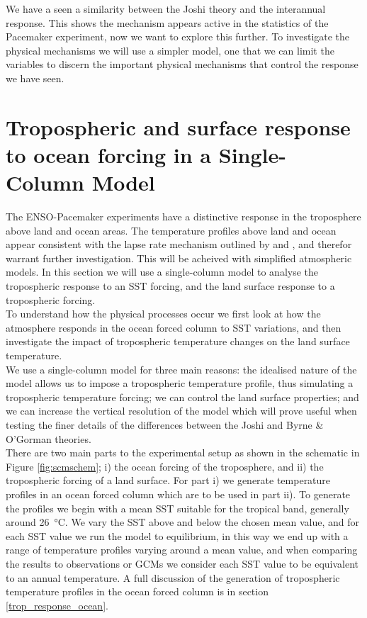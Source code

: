 We have a seen a similarity between the Joshi theory and the interannual 
response. This shows the mechanism appears active in the statistics of the 
Pacemaker experiment, now we want to explore this further. To investigate the 
physical mechanisms we will use a simpler model, one that we can limit the 
variables to discern the important physical mechanisms that control the response 
we have seen.

\section{Tropospheric and surface response to ocean forcing in a Single-Column 
Model}
\label{mech_scm}


The ENSO-Pacemaker experiments have a distinctive response in the troposphere 
above land and ocean areas. The temperature profiles above land and ocean appear
consistent with the lapse rate mechanism outlined by \citet{Joshi2007} and 
\citet{Byrne2013}, and therefor warrant further investigation. This will be 
acheived with simplified atmospheric models. In this section we will use a 
single-column model to analyse the tropospheric response to an SST forcing, and 
the land surface response to a tropospheric forcing.\\
To understand how the physical processes occur we first look at how the 
atmosphere responds in the ocean forced column to SST variations, and then 
investigate the impact of tropospheric temperature changes on the land surface 
temperature.\\
We use a single-column model for three main reasons: the idealised nature of the 
model allows us to impose a tropospheric temperature profile, thus simulating a 
tropospheric temperature forcing; we can control the land surface properties; 
and we can increase the vertical resolution of the model which will prove useful 
when testing the finer details of the differences between the Joshi and Byrne \& 
O'Gorman theories.\\

There are two main parts to the experimental setup as shown in the schematic in 
Figure \ref{fig:scmschem}; i) the ocean forcing of the troposphere, and ii) the 
tropospheric forcing of a land surface.  For part i) we	 generate temperature 
profiles in an ocean forced column which are to be used in part ii). To generate 
the profiles we begin with a mean SST suitable for the tropical band, generally 
around \SI{26}{\degreeCelsius}. We vary the SST above and below the chosen mean 
value, and for each SST value we run the model to equilibrium, in this way we 
end up with a range of temperature profiles varying around a mean value, and 
when comparing the results to observations or GCMs we consider each SST value to 
be equivalent to an annual temperature. A full discussion of the generation of 
tropospheric temperature profiles in the ocean forced column is in section 
\ref{trop_response_ocean}.

